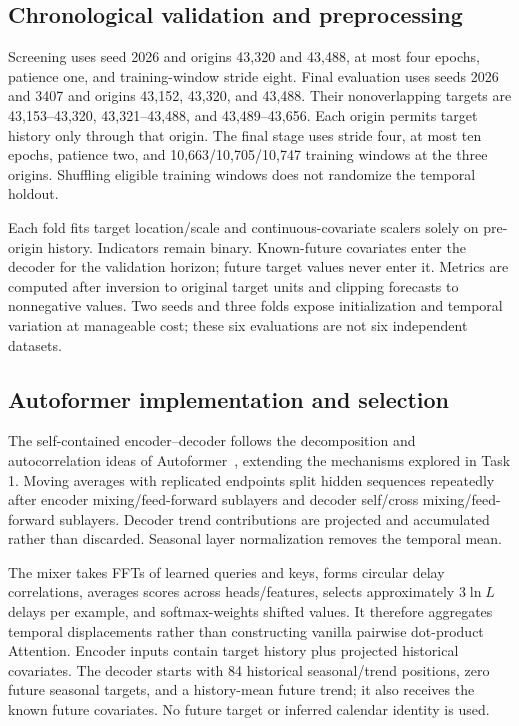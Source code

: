 \subsection*{Chronological validation and preprocessing}
Screening uses seed 2026 and origins 43,320 and 43,488, at most four epochs, patience one, and training-window stride eight. Final evaluation uses seeds 2026 and 3407 and origins 43,152, 43,320, and 43,488. Their nonoverlapping targets are 43,153--43,320, 43,321--43,488, and 43,489--43,656. Each origin permits target history only through that origin. The final stage uses stride four, at most ten epochs, patience two, and 10,663/10,705/10,747 training windows at the three origins. Shuffling eligible training windows does not randomize the temporal holdout.

Each fold fits target location/scale and continuous-covariate scalers solely on pre-origin history. Indicators remain binary. Known-future covariates enter the decoder for the validation horizon; future target values never enter it. Metrics are computed after inversion to original target units and clipping forecasts to nonnegative values. Two seeds and three folds expose initialization and temporal variation at manageable cost; these six evaluations are not six independent datasets.

\subsection*{Autoformer implementation and selection}
The self-contained encoder--decoder follows the decomposition and autocorrelation ideas of Autoformer~\cite{autoformer}, extending the mechanisms explored in Task 1. Moving averages with replicated endpoints split hidden sequences repeatedly after encoder mixing/feed-forward sublayers and decoder self/cross mixing/feed-forward sublayers. Decoder trend contributions are projected and accumulated rather than discarded. Seasonal layer normalization removes the temporal mean.

The mixer takes FFTs of learned queries and keys, forms circular delay correlations, averages scores across heads/features, selects approximately $3\ln L$ delays per example, and softmax-weights shifted values. It therefore aggregates temporal displacements rather than constructing vanilla pairwise dot-product Attention. Encoder inputs contain target history plus projected historical covariates. The decoder starts with 84 historical seasonal/trend positions, zero future seasonal targets, and a history-mean future trend; it also receives the known future covariates. No future target or inferred calendar identity is used.


